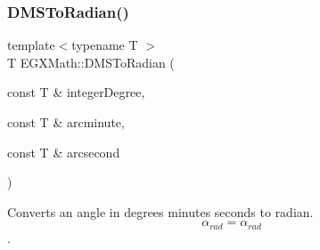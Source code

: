 \mbox{\label{group___e_g_x_math-_angle_conversions-_d_m_s_gaf87ebf95727895ba81084a2246e93211}} 
\subsubsection{\texorpdfstring{D\+M\+S\+To\+Radian()}{DMSToRadian()}}
{\footnotesize\ttfamily template$<$typename T $>$ \\
T E\+G\+X\+Math\+::\+D\+M\+S\+To\+Radian (\begin{DoxyParamCaption}\item[{const T \&}]{integer\+Degree,  }\item[{const T \&}]{arcminute,  }\item[{const T \&}]{arcsecond }\end{DoxyParamCaption})}



Converts an angle in degrees minutes seconds to radian. \[\alpha_{rad}=\alpha_{rad}\]. 

